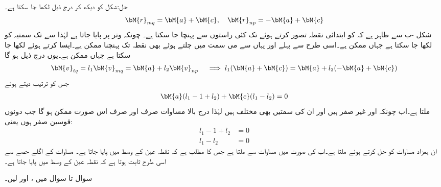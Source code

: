 حل:شکل کو دیکھ کر درج ذیل لکھا جا سکتا ہے۔
\begin{align*}
\bM{r}_{mq}=\bM{a}+\bM{c},\quad \bM{r}_{np}=-\bM{a}+\bM{c}
\end{align*}
شکل -ب سے ظاہر ہے کہ  کو ابتدائی نقطہ تصور کرتے ہوئے  تک کئی راستوں سے پہنچا جا سکتا ہے۔ چونکہ   وتر  پر پایا جاتا ہے لہٰذا  سے  تک سمتیہ  کو  لکھا جا سکتا ہے جہاں  ممکن ہے۔اسی طرح   سے پہلے  اور یہاں سے  می سمت میں چلتے ہوئے بھی نقطہ  تک پہنچنا ممکن ہے۔ایسا کرتے ہوئے 
 لکھا جا سکتا ہے جہاں  ممکن ہے۔یوں درج ذیل ہو گا
\begin{align}\label{مساوات_الجبرا_مثال_وتری_قطع}
\bM{v}_{tq}=l_1\bM{v}_{mq}=\bM{a}+l_2\bM{v}_{np}\quad \implies l_1(\bM{a}+\bM{c})=\bM{a}+l_2(-\bM{a}+\bM{c})
\end{align}
جس کو ترتیب دیتے ہوئے
\begin{align*}
\bM{a}(l_1-1+l_2)+\bM{c}(l_1-l_2)=0
\end{align*}
ملتا ہے۔اب چونکہ  اور  غیر صفر ہیں اور ان کی سمتیں بھی مختلف ہیں لہٰذا درج بالا مساوات صرف اور صرف اس صورت ممکن ہو گا جب دونوں قوسین صفر ہوں یعنی:
\begin{align*}
l_1-1+l_2&=0\\
l_1-l_2&=0
\end{align*}
ان ہمزاد مساوات کو حل کرتے ہوئے  ملتا ہے۔اب  کی صورت میں مساوات  سے  
ملتا  ہے جس کا مطلب ہے کہ نقطہ  عین  کے وسط میں پایا جاتا ہے۔ مساوات  کے اگلے حصے سے اسی طرح ثابت ہوتا ہے کہ نقطہ  عین  کے وسط میں پایا جاتا ہے۔

سوال  تا سوال  میں ،  اور  لیں۔

